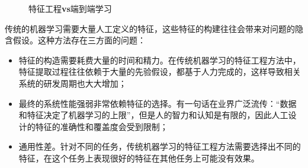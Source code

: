     \begin{figure}[htp]
    \centering
    \subfigcapskip=8pt
 \vfill
\caption{特征工程{\small\sffamily\bfseries{vs}}端到端学习}
\label{fig:5-2}
\end {figure}

\parinterval 传统的机器学习需要大量人工定义的特征，这些特征的构建往往会带来对问题的隐含假设。这种方法存在三方面的问题：

\begin{itemize}
\vspace{0.5em}
\item 特征的构造需要耗费大量的时间和精力。在传统机器学习的特征工程方法中，特征提取过程往往依赖于大量的先验假设，都基于人力完成的，这样导致相关系统的研发周期也大大增加；
\vspace{0.5em}
\item 最终的系统性能强弱非常依赖特征的选择。有一句话在业界广泛流传：``数据和特征决定了机器学习的上限''，但是人的智力和认知是有限的，因此人工设计的特征的准确性和覆盖度会受到限制；
\vspace{0.5em}
\item 通用性差。针对不同的任务，传统机器学习的特征工程方法需要选择出不同的特征，在这个任务上表现很好的特征在其他任务上可能没有效果。
\vspace{0.5em}
\end{itemize}

